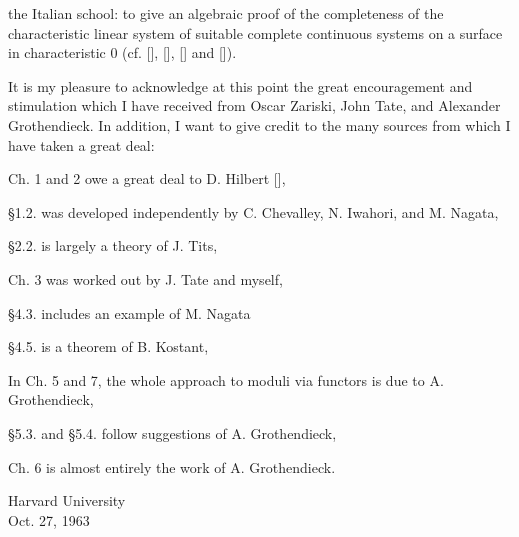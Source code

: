 
the Italian school: to give an algebraic proof of the completeness of the characteristic linear system of suitable complete continuous systems on a surface in characteristic 0 (cf. [], [], [] and []).

It is my pleasure to acknowledge at this point the great encouragement and stimulation which I have received from Oscar Zariski, John Tate, and Alexander Grothendieck. In addition, I want to give credit to the many sources from which I have taken a great deal:

Ch. 1 and 2 owe a great deal to D. Hilbert [],

\S1.2. was developed independently by C. Chevalley, N. Iwahori, and M. Nagata,

\S2.2. is largely a theory of J. Tits,

Ch. 3 was worked out by J. Tate and myself,

\S4.3. includes an example of M. Nagata

\S4.5. is a theorem of B. Kostant,

In Ch. 5 and 7, the whole approach to moduli via functors is due to A. Grothendieck,

\S5.3. and \S5.4. follow suggestions of A. Grothendieck,

Ch. 6 is almost entirely the work of A. Grothendieck.

\begin{flushright}
Harvard University\\
Oct. 27, 1963
\end{flushright}

